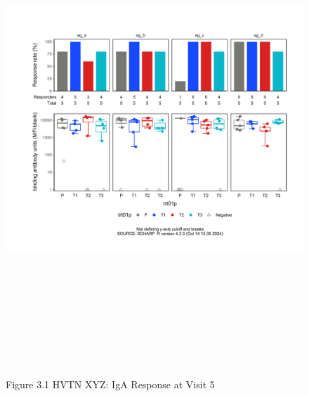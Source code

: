 \documentclass[12pt]{article}
\begin{document}
\begin{figure}[H]

{\centering \includegraphics[width=8.75in,height=7.25in]{test_cases_files/figure-latex/unnamed-chunk-6-1} 

}

\caption[Figure 3.1 boxplot (pos. response boxplots)]{Figure 3.1 HVTN XYZ: IgA Response at Visit 5}\label{fig:unnamed-chunk-6-1}
\end{figure}
\end{document}
